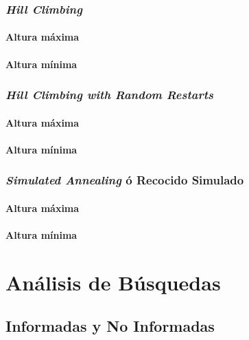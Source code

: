 \documentclass[12pt, letterpaper]{article}
\begin{document}
        \subsubsection{\textit{Hill Climbing}}

            \paragraph{Altura máxima}

            \paragraph{Altura mínima}

        \subsubsection{\textit{Hill Climbing with Random Restarts}}

            \paragraph{Altura máxima}

            \paragraph{Altura mínima}

        \subsubsection{\textit{Simulated Annealing} ó Recocido Simulado}

            \paragraph{Altura máxima}

            \paragraph{Altura mínima}

\section{Análisis de Búsquedas}

    \subsection{Informadas y No Informadas}
\end{document}
